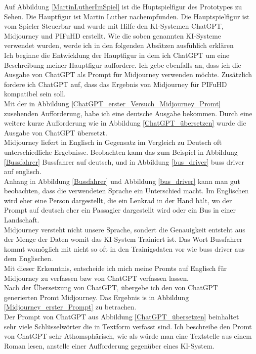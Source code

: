 \documentclass[10pt,a4paper,bibliography=totocnumbered,listof=totocnumbered]{scrartcl}
\begin{document}
Auf Abbildung \ref{MartinLutherImSpiel} ist die Huptspielfigur des Prototypes zu Sehen. Die Hauptfigur ist Martin Luther nachempfunden. Die Hauptspielfigur ist vom Spieler Steuerbar und wurde mit Hilfe den KI-Systemen ChatGPT, Midjourney und PIFuHD erstellt. Wie die soben genannten KI-Systeme verwendet wurden, werde ich in den folgenden Absätzen ausfühlich erklären
\\
Ich beginne die Entwicklung der Hauptfigur in dem ich ChatGPT um eine Beschreibung meiner Hauptfigur auffordere. Ich gebe ebenfalls an, dass ich die Ausgabe von ChatGPT als Prompt für Midjourney verwenden möchte. Zusätzlich fordere ich ChatGPT auf, dass das Ergebnis von Midjourney für PIFuHD kompatibel sein soll.
\\
Mit der in Abbildung \ref{ChatGPT_erster_Versuch_Midjourney_Promt} zusehenden Aufforderung, habe ich eine deutsche Ausgabe bekommen. Durch eine weitere kurze Aufforderung wie in Abbildung \ref{ChatGPT_übersetzen} wurde die Ausgabe von ChatGPT übersetzt.
\\
Midjourney liefert in Englisch in Gegensatz im Vergleich zu Deutsch oft unterschiedliche Ergebnisse. Beobachten kann das zum Beispiel in Abbildung \ref{Bussfahrer} Bussfahrer auf deutsch, und in Abbildung \ref{bus_driver} buss driver auf englisch.
\\
Anhang in Abbildung \ref{Bussfahrer} und Abbildung \ref{bus_driver} kann man gut beobachten, dass die verwendeten Sprache ein Unterschied macht. Im Englischen wird eher eine Person dargestellt, die ein Lenkrad in der Hand hält, wo der Prompt auf deutsch eher ein Passagier dargestellt wird oder ein Bus in einer Landschaft.
\\
Midjourney versteht nicht unsere Sprache, sondert die Genauigkeit entsteht aus der Menge der Daten womit das KI-System Trainiert ist. Das Wort Bussfahrer kommt womöglich mit nicht so oft in den Trainigsdaten vor wie buss driver aus dem Englischen.
\\
Mit dieser Erkenntnis, entscheide ich mich meine Promts auf Englisch für Midjourney zu verfassen bzw von ChatGPT verfassen lassen.
\\
Nach der Übersetzung von ChatGPT, übergebe ich den von ChatGPT generierten Promt Midjourney. Das Ergebnis is in Abbildung \ref{Midjourney_erster_Prompt} zu betrachen.
\\
Der Prompt von ChatGPT aus Abbildung \ref{ChatGPT_übersetzen} beinhaltet sehr viele Schlüsselwörter die in Textform verfasst sind. Ich beschreibe den Promt von ChatGPT sehr Athomsphärisch, wie als würde man eine Textstelle aus einem Roman lesen, anstelle einer Aufforderung gegenüber eines KI-System.
\end{document}
